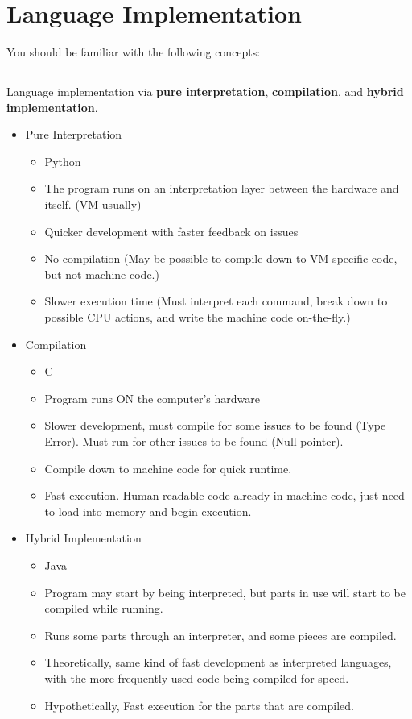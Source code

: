 \section{Language Implementation}\label{sec:Language_Implementation}
You should be familiar with the following concepts:
\subsection{}
Language implementation via \textbf{pure interpretation}, \textbf{compilation}, and \textbf{hybrid implementation}.
\begin{itemize}
\item Pure Interpretation
  \begin{itemize}[noitemsep]
  \item Python
  \item The program runs on an interpretation layer between the hardware and itself. (VM usually)
  \item Quicker development with faster feedback on issues
  \item No compilation (May be possible to compile down to VM-specific code, but not machine code.)
  \item Slower execution time (Must interpret each command, break down to possible CPU actions, and write the machine code on-the-fly.)
  \end{itemize}

\item Compilation
  \begin{itemize}[noitemsep]
  \item C
  \item Program runs ON the computer's hardware
  \item Slower development, must compile for some issues to be found (Type Error). Must run for other issues to be found (Null pointer).
  \item Compile down to machine code for quick runtime.
  \item Fast execution. Human-readable code already in machine code, just need to load into memory and begin execution.
  \end{itemize}

\item Hybrid Implementation
  \begin{itemize}[noitemsep]
  \item Java
  \item Program may start by being interpreted, but parts in use will start to be compiled while running.
  \item Runs some parts through an interpreter, and some pieces are compiled.
  \item Theoretically, same kind of fast development as interpreted languages, with the more frequently-used code being compiled for speed.
  \item Hypothetically, Fast execution for the parts that are compiled.
  \end{itemize}
\end{itemize}

